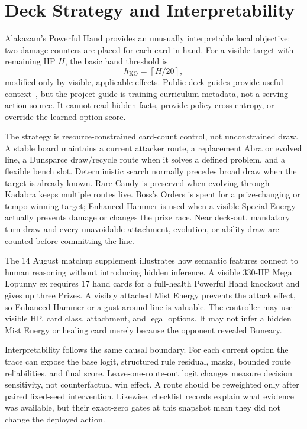 \section{Deck Strategy and Interpretability}

Alakazam's Powerful Hand provides an unusually interpretable local objective:
two damage counters are placed for each card in hand. For a visible target with
remaining HP $H$, the basic hand threshold is
\begin{equation}
  h_{\mathrm{KO}}=\left\lceil H/20\right\rceil,
\end{equation}
modified only by visible, applicable effects. Public deck guides provide useful
context~\cite{tcgplayerAlakazamGuide,ptcgoAlakazamGuide}, but the project guide
is training curriculum metadata, not a serving action source. It cannot read
hidden facts, provide policy cross-entropy, or override the learned option
score.

The strategy is resource-constrained card-count control, not unconstrained
draw. A stable board maintains a current attacker route, a replacement Abra or
evolved line, a Dunsparce draw/recycle route when it solves a defined problem,
and a flexible bench slot. Deterministic search normally precedes broad draw
when the target is already known. Rare Candy is preserved when evolving through
Kadabra keeps multiple routes live. Boss's Orders is spent for a prize-changing
or tempo-winning target; Enhanced Hammer is used when a visible Special Energy
actually prevents damage or changes the prize race. Near deck-out, mandatory
turn draw and every unavoidable attachment, evolution, or ability draw are
counted before committing the line.

The 14 August matchup supplement illustrates how semantic features connect to
human reasoning without introducing hidden inference. A visible 330-HP Mega
Lopunny ex requires 17 hand cards for a full-health Powerful Hand knockout and
gives up three Prizes. A visibly attached Mist Energy prevents the attack effect,
so Enhanced Hammer or a gust-around line is valuable. The controller may use
visible HP, card class, attachment, and legal options. It may not infer a hidden
Mist Energy or healing card merely because the opponent revealed Buneary.

Interpretability follows the same causal boundary. For each current option the
trace can expose the base logit, structured rule residual, masks, bounded route
reliabilities, and final score. Leave-one-route-out logit changes measure
decision sensitivity, not counterfactual win effect. A route should be
reweighted only after paired fixed-seed intervention. Likewise, checklist
records explain what evidence was available, but their exact-zero gates at this
snapshot mean they did not change the deployed action.

